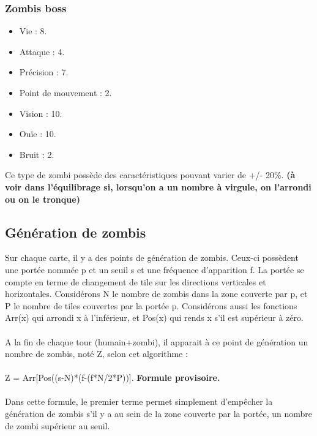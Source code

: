 \subsubsection{Zombis boss}
\begin{itemize}
  \item Vie : 8.
  \item Attaque : 4.
  \item Précision : 7.
  \item Point de mouvement : 2.
  \item Vision : 10.
  \item Ouïe : 10.
  \item Bruit : 2.
\end{itemize}
Ce type de zombi possède des caractéristiques pouvant varier de +/- 20\%. \textbf{(à voir dans l'équilibrage si, lorsqu'on a un nombre à virgule, on l'arrondi ou on le tronque)}
\subsection{Génération de zombis}
Sur chaque carte, il y a des points de génération de zombis. Ceux-ci possèdent une portée nommée p et un seuil s et une fréquence d'apparition f. La portée se compte en terme de changement de tile sur les directions verticales et horizontales. Considérons N le nombre de zombis dans la zone couverte par p, et P le nombre de tiles couvertes par la portée p. Considérons aussi les fonctions Arr(x) qui arrondi x à l'inférieur, et Pos(x) qui rends x s'il est supérieur à zéro.
\\\\
A la fin de chaque tour (humain+zombi), il apparait à ce point de génération un nombre de zombis, noté Z, selon cet algorithme :\\\\
Z = Arr[Pos((s-N)*(f-(f*N/2*P))].
\textbf{Formule provisoire.}\\\\
Dans cette formule, le premier terme permet simplement d'empêcher la génération de zombis s'il y a au sein de la zone couverte par la portée, un nombre de zombi supérieur au seuil.

